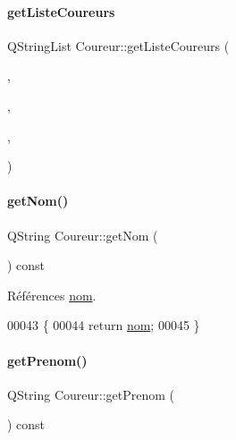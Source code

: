 \paragraph{\texorpdfstring{get\+Liste\+Coureurs}{getListeCoureurs}\hspace{0.1cm}{\footnotesize\ttfamily [2/2]}}
{\footnotesize\ttfamily Q\+String\+List Coureur\+::get\+Liste\+Coureurs (\begin{DoxyParamCaption}\item[{Q\+String}]{,  }\item[{Q\+String}]{,  }\item[{Q\+String}]{,  }\item[{Q\+String}]{ }\end{DoxyParamCaption})\hspace{0.3cm}{\ttfamily [slot]}}

\mbox{\label{class_coureur_a1808f13910638c6f2a57e87be522adf3}} 
\paragraph{\texorpdfstring{get\+Nom()}{getNom()}}
{\footnotesize\ttfamily Q\+String Coureur\+::get\+Nom (\begin{DoxyParamCaption}{ }\end{DoxyParamCaption}) const}



Références \hyperlink{class_coureur_ac96ff159efad8a6fd3abbe1a37b51c24}{nom}.


\begin{DoxyCode}
00043 \{
00044     \textcolor{keywordflow}{return} \hyperlink{class_coureur_ac96ff159efad8a6fd3abbe1a37b51c24}{nom};
00045 \}
\end{DoxyCode}
\mbox{\label{class_coureur_a54a92a0fcaf7db9079f9d3f5d043539c}} 
\paragraph{\texorpdfstring{get\+Prenom()}{getPrenom()}}
{\footnotesize\ttfamily Q\+String Coureur\+::get\+Prenom (\begin{DoxyParamCaption}{ }\end{DoxyParamCaption}) const}



